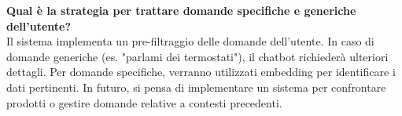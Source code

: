 \begin{itemize}
\textbf{Qual è la strategia per trattare domande specifiche e generiche dell'utente?}\\
Il sistema implementa un pre-filtraggio delle domande dell'utente. In caso di domande generiche (es. "parlami dei termostati"), il chatbot richiederà ulteriori dettagli. Per domande specifiche, verranno utilizzati embedding per identificare i dati pertinenti. In futuro, si pensa di implementare un sistema per confrontare prodotti o gestire domande relative a contesti precedenti.\\


\end{itemize}